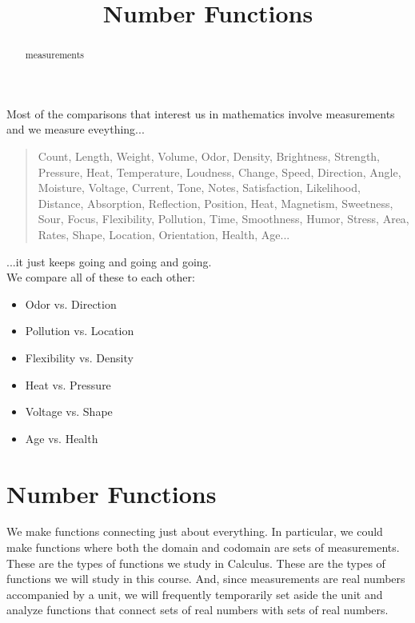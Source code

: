 \documentclass{ximera}
\title{Number Functions}
\begin{document}
\begin{abstract}
measurements
\end{abstract}
\maketitle





Most of the comparisons that interest us in mathematics involve measurements and we measure eveything...\\

\begin{quote}
Count, Length, Weight, Volume, Odor, Density, Brightness, Strength, Pressure, Heat, Temperature, Loudness, Change, Speed, Direction, Angle, Moisture, Voltage, Current, Tone, Notes, Satisfaction, Likelihood, Distance, Absorption, Reflection, Position, Heat, Magnetism, Sweetness, Sour, Focus, Flexibility, Pollution, Time, Smoothness, Humor, Stress, Area, Rates, Shape, Location, Orientation, Health, Age... \\
\end{quote}


...it just keeps going and going and going. \\


We compare all of these to each other:



\begin{itemize}
\item Odor vs. Direction
\item Pollution vs. Location
\item Flexibility vs. Density
\item Heat vs. Pressure
\item Voltage vs. Shape 
\item Age vs. Health
\end{itemize}







\section{Number Functions}

We make functions connecting just about everything.  In particular, we could make functions where both the domain and codomain are sets of measurements. These are the types of functions we study in Calculus.  These are the types of functions we will study in this course.  And, since measurements are real numbers accompanied by a unit, we will frequently temporarily set aside the unit and analyze functions that connect sets of real numbers with sets of real numbers. \\
\end{document}
